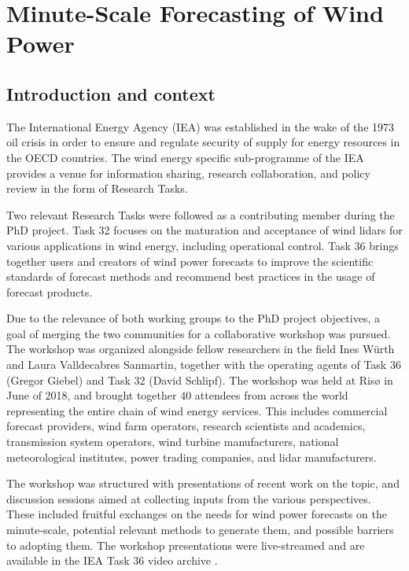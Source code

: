 \chapter{Minute-Scale Forecasting of Wind Power}


\clearpage
\section{Introduction and context}

The International Energy Agency (IEA) was established in the wake of the 1973 oil crisis in order to ensure and regulate security of supply for energy resources in the OECD countries. The wind energy specific sub-programme of the IEA provides a venue for information sharing, research collaboration, and policy review in the form of Research Tasks.

Two relevant Research Tasks were followed as a contributing member during the PhD project.  Task 32 focuses on the maturation and acceptance of wind lidars for various applications in wind energy, including operational control. Task 36 brings together users and creators of wind power forecasts to improve the scientific standards of forecast methods and recommend best practices in the usage of forecast products.

Due to the relevance of both working groups to the PhD project objectives, a goal of merging the two communities for a collaborative workshop was pursued. The workshop was organized alongside fellow researchers in the field Ines W\"urth and Laura Valldecabres Sanmartin, together with the operating agents of Task 36 (Gregor Giebel) and Task 32 (David Schlipf).
The workshop was held at Ris{\o} in June of 2018, and brought together 40 attendees from across the world representing the entire chain of wind energy services.  This includes commercial forecast providers, wind farm operators, research scientists and academics, transmission system operators, wind turbine manufacturers, national meteorological institutes, power trading companies, and lidar manufacturers. 

The workshop was structured with presentations of recent work on the topic, and discussion sessions aimed at collecting inputs from the various perspectives. These included fruitful exchanges on the needs for wind power forecasts on the minute-scale, potential relevant methods to generate them, and possible barriers to adopting them. The workshop presentations were live-streamed and are available in the IEA Task 36 video archive \cite{IEA_youtube}.

